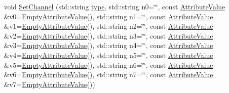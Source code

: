 \begin{DoxyCompactItemize}
\item 
void \hyperlink{classns3_1_1SpectrumChannelHelper_a11ffe86edea8cdd30f181e41c0e3e29f}{Set\+Channel} (std\+::string \hyperlink{visualizer-ideas_8txt_add98db9e15e2a58cf2b57623e7aa893a}{type}, std\+::string n0=\char`\"{}\char`\"{}, const \hyperlink{classns3_1_1AttributeValue}{Attribute\+Value} \&v0=\hyperlink{classns3_1_1EmptyAttributeValue}{Empty\+Attribute\+Value}(), std\+::string n1=\char`\"{}\char`\"{}, const \hyperlink{classns3_1_1AttributeValue}{Attribute\+Value} \&v1=\hyperlink{classns3_1_1EmptyAttributeValue}{Empty\+Attribute\+Value}(), std\+::string n2=\char`\"{}\char`\"{}, const \hyperlink{classns3_1_1AttributeValue}{Attribute\+Value} \&v2=\hyperlink{classns3_1_1EmptyAttributeValue}{Empty\+Attribute\+Value}(), std\+::string n3=\char`\"{}\char`\"{}, const \hyperlink{classns3_1_1AttributeValue}{Attribute\+Value} \&v3=\hyperlink{classns3_1_1EmptyAttributeValue}{Empty\+Attribute\+Value}(), std\+::string n4=\char`\"{}\char`\"{}, const \hyperlink{classns3_1_1AttributeValue}{Attribute\+Value} \&v4=\hyperlink{classns3_1_1EmptyAttributeValue}{Empty\+Attribute\+Value}(), std\+::string n5=\char`\"{}\char`\"{}, const \hyperlink{classns3_1_1AttributeValue}{Attribute\+Value} \&v5=\hyperlink{classns3_1_1EmptyAttributeValue}{Empty\+Attribute\+Value}(), std\+::string n6=\char`\"{}\char`\"{}, const \hyperlink{classns3_1_1AttributeValue}{Attribute\+Value} \&v6=\hyperlink{classns3_1_1EmptyAttributeValue}{Empty\+Attribute\+Value}(), std\+::string n7=\char`\"{}\char`\"{}, const \hyperlink{classns3_1_1AttributeValue}{Attribute\+Value} \&v7=\hyperlink{classns3_1_1EmptyAttributeValue}{Empty\+Attribute\+Value}())
\item 

\end{DoxyCompactItemize}
